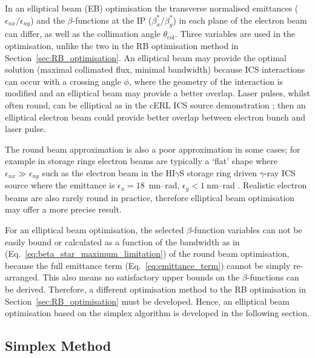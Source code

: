 \documentclass[../main.tex]{subfiles}
\begin{document}
In an elliptical beam (EB) optimisation the transverse normalised emittances ($\epsilon_{nx}/\epsilon_{ny}$) and the $\beta$-functions at the IP ($\beta_{x}^{*}/\beta_{y}^{*}$) in each plane of the electron beam can differ, as well as the collimation angle $\theta_{\mathrm{col}}$. Three variables are used in the optimisation, unlike the two in the RB optimisation method in Section~\ref{sec:RB_optimisation}. An elliptical beam may provide the optimal solution (maximal collimated flux, minimal bandwidth) because ICS interactions can occur with a crossing angle $\phi$, where the geometry of the interaction is modified and an elliptical beam may provide a better overlap. Laser pulses, whilst often round, can be elliptical as in the cERL ICS source demonstration \cite{akagi2016narrow}; then an elliptical electron beam could provide better overlap between electron bunch and laser pulse.     

The round beam approximation is also a poor approximation in some cases; for example in storage rings electron beams are typically a `flat' shape where $\epsilon_{nx} \gg \epsilon_{ny}$ such as the electron beam in the HI$\gamma$S storage ring driven $\gamma$-ray ICS source where the emittance is $\epsilon_{x} = 18$~\si{\nano\meter}--\si{\radian}, $\epsilon_{y} < 1~\si{\nano\meter}$--\si{\radian} \cite{wu1996performance,weller2009research}. Realistic electron beams are also rarely round in practice, therefore elliptical beam optimisation may offer a more precise result.

For an elliptical beam optimisation, the selected $\beta$-function variables can not be easily bound or calculated as a function of the bandwidth as in (Eq.~\ref{eq:beta_star_maximum_limitation}) of the round beam optimisation, because the full emittance term (Eq.~\ref{eq:emittance_term}) cannot be simply re-arranged. This also means no satisfactory upper bounds on the $\beta$-functions can be derived. Therefore, a different optimisation method to the RB optimisation in Section~\ref{sec:RB_optimisation} must be developed. Hence, an elliptical beam optimisation based on the simplex algorithm is developed in the following section.  

\subsection{Simplex Method}
\label{sec:simplex_optimisation}
\end{document}
